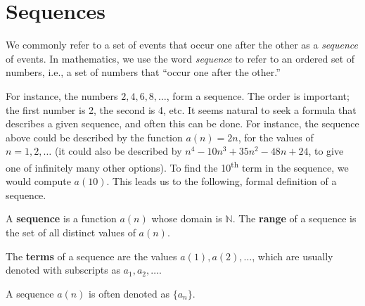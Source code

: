 
\section{Sequences}\label{sec:sequences}

We commonly refer to a set of events that occur one after the other as a \emph{sequence} of events. In mathematics, we use the word \emph{sequence} to refer to an ordered set of numbers, i.e., a set of numbers that ``occur one after the other.''

For instance, the numbers $2, 4, 6, 8, \dotsc$, form a sequence. The order is important; the first number is 2, the second is 4, etc. It seems natural to seek a formula that describes a given sequence, and often this can be done. For instance, the sequence above could be described by the function $a(n) = 2n$, for the values of $n = 1, 2, \dotsc$ (it could also be described by $n^4-10 n^3+35 n^2-48n+24$, to give one of infinitely many other options). To find the 10\textsuperscript{th} term in the sequence, we would compute $a(10)$. This leads us to the following, formal definition of a sequence.

\begin{definition}[Sequence]\label{def:sequence}%
%
%
A \textbf{sequence} is a function $a(n)$ whose domain is $\mathbb{N}$. The \textbf{range} of a sequence is the set of all distinct values of $a(n)$.
\bigskip

The \textbf{terms} of a sequence are the values $a(1), a(2), \dotsc$, which are usually denoted with subscripts as $a_1, a_2, \dotsc$.\bigskip

A sequence $a(n)$ is often denoted as $\{a_n\}$.
\end{definition}




